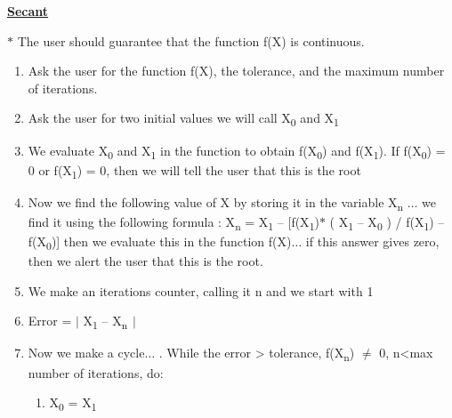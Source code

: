 \documentclass[12pt]{article}
\renewcommand{\_}{\kern-1.5pt\textunderscore\kern-1.5pt}
\begin{document}
{\fontsize{16pt}{19.2pt}\selectfont \textbf{\uline{Secant }}\par}\par

$\ast$ The user should guarantee that the function f(X) is continuous. \par

\begin{enumerate}
	\item Ask the user for the function f(X), the tolerance, and the maximum number of iterations. \par

	\item Ask the user for two initial values we will call X\textsubscript{0 }and X\textsubscript{1 }\par

	\item We evaluate X\textsubscript{0 }and X\textsubscript{1 }in the function to obtain f(X\textsubscript{0}) and f(X\textsubscript{1}). If f(X\textsubscript{0}) = 0 or f(X\textsubscript{1}) = 0, then we will tell the user that this is the root\par

	\item Now we find the following value of X by storing it in the variable X\textsubscript{n }$ \ldots $  we find it using the following formula : X\textsubscript{n }= X\textsubscript{1 }– [f(X\textsubscript{1})$\ast$ ( X\textsubscript{1 }– X\textsubscript{0 }) / f(X\textsubscript{1}) – f(X\textsubscript{0})] then we evaluate this in the function f(X)$ \ldots $  if this answer gives zero, then we alert the user that this is the root. \par

	\item We make an iterations counter, calling it n and we start with 1\par

	\item Error = $ \vert $  X\textsubscript{1 }– X\textsubscript{n\  }$ \vert $ \textsubscript{  }\par

	\item Now we make a cycle$ \ldots $ . While the error > tolerance, f(X\textsubscript{n}) $ \neq $  0, n<max number of iterations, do: \par

\begin{enumerate}
	\item X\textsubscript{0 }= X\textsubscript{1 }\par


\end{enumerate}
\end{enumerate}
\end{document}
